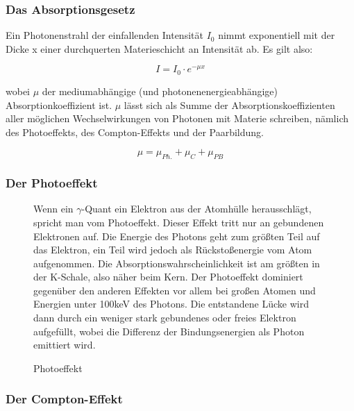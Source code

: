 \subsubsection{Das Absorptionsgesetz}

Ein Photonenstrahl der einfallenden Intensität $I_0$ nimmt exponentiell mit der Dicke x einer durchquerten Materieschicht an Intensität ab. Es gilt also:

$$ I = I_0\cdot e^{-\mu x} $$

wobei $\mu$ der mediumabhängige (und photonenenergieabhängige) Absorptionkoeffizient ist. $\mu$ lässt sich als Summe der Absorptionskoeffizienten aller möglichen Wechselwirkungen von Photonen mit Materie schreiben, nämlich des Photoeffekts, des Compton-Effekts und der Paarbildung.

$$\mu = \mu_{Ph.} + \mu_{C} + \mu_{PB} $$

\subsubsection{Der Photoeffekt}

\begin{figure}[H]
	\begin{minipage}{0.59\textwidth}
	\centering%
	\caption{Photoeffekt}
	\end{minipage}
	\begin{minipage}{0.4\textwidth}
	Wenn ein $\gamma$-Quant ein Elektron aus der Atomhülle herausschlägt, spricht man vom Photoeffekt. Dieser Effekt tritt nur an gebundenen Elek\-tro\-nen auf. Die Energie des Photons geht zum größten Teil auf das Elektron, ein Teil wird jedoch als Rückstoßenergie vom Atom aufgenommen. Die Ab\-sorp\-tions\-wahrscheinlichkeit ist am größten in der K-Schale, also näher beim Kern. Der Photoeffekt dominiert gegenüber den anderen Effekten vor allem bei großen Atomen und Energien unter 100keV des Photons. Die entstandene Lücke wird dann durch ein weniger stark gebundenes oder freies Elektron aufgefüllt, wobei die Differenz der Bindungsenergien als Photon emittiert wird.
	\end{minipage}
\end{figure}

\subsubsection{Der Compton-Effekt}


